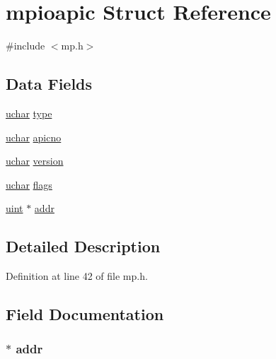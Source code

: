\hypertarget{structmpioapic}{\section{mpioapic Struct Reference}
\label{structmpioapic}
}


{\ttfamily \#include $<$mp.\-h$>$}

\subsection*{Data Fields}
\begin{DoxyCompactItemize}
\item 
\hyperlink{types_8h_a65f85814a8290f9797005d3b28e7e5fc}{uchar} \hyperlink{structmpioapic_a7720cfa5e476235d84bbe5bb8ad56959}{type}
\item 
\hyperlink{types_8h_a65f85814a8290f9797005d3b28e7e5fc}{uchar} \hyperlink{structmpioapic_ad5298ed5a85376e373300bfe473b5ceb}{apicno}
\item 
\hyperlink{types_8h_a65f85814a8290f9797005d3b28e7e5fc}{uchar} \hyperlink{structmpioapic_aa6ea6b1d12a723848cc34b199ddd8aef}{version}
\item 
\hyperlink{types_8h_a65f85814a8290f9797005d3b28e7e5fc}{uchar} \hyperlink{structmpioapic_abe146a6a9523880d7ce48965f8d07b34}{flags}
\item 
\hyperlink{types_8h_a91ad9478d81a7aaf2593e8d9c3d06a14}{uint} $\ast$ \hyperlink{structmpioapic_aab4c2e8e264b16f9babb746d5e7250d5}{addr}
\end{DoxyCompactItemize}


\subsection{Detailed Description}


Definition at line 42 of file mp.\-h.



\subsection{Field Documentation}
\hypertarget{structmpioapic_aab4c2e8e264b16f9babb746d5e7250d5}{
\subsubsection[{addr}]{$\ast$ addr}}\label{structmpioapic_aab4c2e8e264b16f9babb746d5e7250d5}


